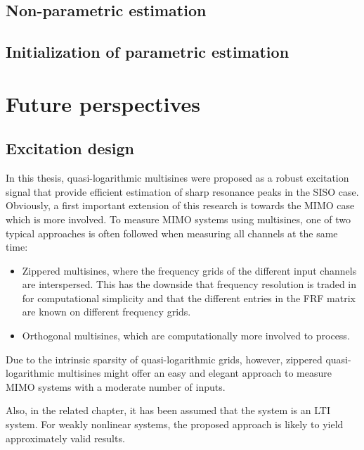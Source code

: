   \subsection{Non-parametric estimation}
  \subsection{Initialization of parametric estimation}


\section{Future perspectives}
  \subsection{Excitation design}
  In this thesis, quasi-logarithmic multisines were proposed as a robust excitation signal that provide efficient estimation of sharp resonance peaks in the \gls{SISO} case.
  Obviously, a first important extension of this research is towards the \gls{MIMO} case which is more involved.
  To measure \gls{MIMO} systems using multisines, one of two typical approaches is often followed when measuring all channels at the same time:
  \begin{itemize}
    \item Zippered multisines, where the frequency grids of the different input channels are interspersed. This has the downside that frequency resolution is traded in for computational simplicity and that the different entries in the \gls{FRF} matrix are known on different frequency grids.
    \item Orthogonal multisines, which are computationally more involved to process.
  \end{itemize}
  Due to the intrinsic sparsity of quasi-logarithmic grids, however, zippered quasi-logarithmic multisines might offer an easy and elegant  approach to measure \gls{MIMO} systems with a moderate number of inputs.

  Also, in the related chapter, it has been assumed that the system is an \gls{LTI} system.
  For weakly nonlinear systems, the proposed approach is likely to yield approximately valid results.

